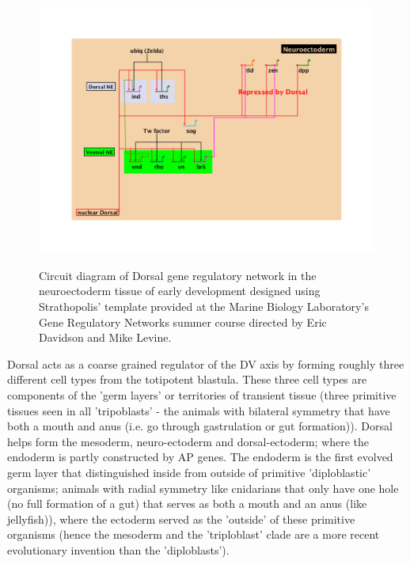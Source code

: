 \begin{figure}
  \includegraphics[width=1\textwidth]{slide2jacob}\\
  \caption{Circuit diagram of Dorsal gene regulatory network in the neuroectoderm tissue of early development designed using Strathopolis' template\cite{pmid16198288} provided at the Marine Biology Laboratory's Gene Regulatory Networks summer course directed by Eric Davidson and Mike Levine.}\label{shift2}
\end{figure}
  
Dorsal acts as a coarse grained regulator of the DV axis by forming roughly three different cell types from the totipotent blastula.  These three cell types are components of the 'germ layers' or territories of transient tissue (three primitive tissues seen in all 'tripoblasts' - the animals with bilateral symmetry that have both a mouth and anus (i.e. go through gastrulation or gut formation)).  Dorsal helps form the mesoderm, neuro-ectoderm and dorsal-ectoderm; where the endoderm is partly constructed by AP genes.  The endoderm is the first evolved germ layer that distinguished inside from outside of primitive 'diploblastic' organisms; animals with radial symmetry like cnidarians that only have one hole (no full formation of a gut) that serves as both a mouth and an anus (like jellyfish)), where the ectoderm served as the 'outside' of these primitive organisms (hence the mesoderm and the 'triploblast' clade are a more recent evolutionary invention than the 'diploblasts'). 

